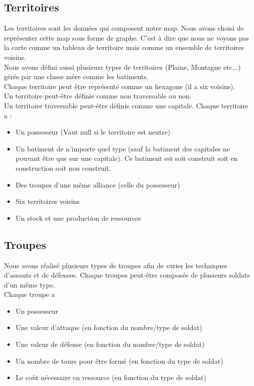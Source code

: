   \subsection{Territoires}
    Les territoires sont les données qui composent notre map. Nous avons choisi de représenter cette map sous forme de graphe. C'est à dire que nous ne voyons pas la carte comme un tableau de
    territoire mais comme un ensemble de territoires voisins. \\
    Nous avons défini aussi plusieurs types de territoires (Plaine, Montagne etc...) gérés par une classe mère comme les batiments. \\
    Chaque territoire peut être représenté comme un hexagone (il a six voisins). \\
    Un territoire peut-être définie comme non traversable ou non. \\
    Un territoire traversable peut-être définie comme une capitale.
    \vspace{0.5cm}
    Chaque territoire a :
    \begin{itemize}
      \item Un possesseur (Vaut null si le territoire est neutre)
      \item Un  batiment de n'importe quel type (sauf la batiment des capitales ne pouvant être que sur une capitale). Ce batiment est soit construit soit en construction soit non construit.
      \item Des troupes d'une même alliance (celle du possesseur)
      \item Six territoires voisins
      \item Un stock et une production de ressources
    \end{itemize}

  
  \subsection{Troupes}
	Nous avons réalisé plusieurs types de troupes afin de varier les techniques d'assauts et de défenses. Chaque troupes peut-être composée de plusieurs soldats d'un même type. \\
	Chaque troupe a \\
    \begin{itemize}
      \item Un possesseur
      \item Une valeur d'attaque (en fonction du nombre/type de soldat)
      \item Une valeur de défense (en fonction du nombre/type de soldat)
      \item Un nombre de tours pour être formé (en fonction du type de soldat)
      \item Le coût nécessaire en ressource (en fonction du type de soldat)
    \end{itemize}
  
